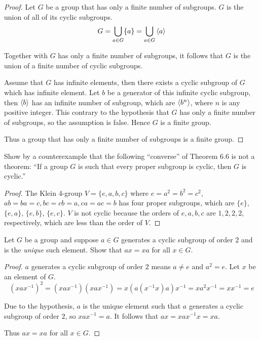 \begin{proof}
    Let $G$ be a group that has only a finite number of subgroups. $G$ is the union of all of its cyclic subgroups.
    \[
        G = \bigcup_{a\in G} \{ a \} = \bigcup_{a\in G}\left\langle{a}\right\rangle
    \]

    Together with $G$ has only a finite number of subgroups, it follows that $G$ is the union of a finite number of cyclic subgroups.

    Assume that $G$ has infinite elements, then there exists a cyclic subgroup of $G$ which has infinite element. Let $b$ be a generator of this infinite cyclic subgroup, then $\left\langle{b}\right\rangle$ has an infinite number of subgroup, which are $\left\langle{b^{n}}\right\rangle$, where $n$ is any positive integer. This contrary to the hypothesis that $G$ has only a finite number of subgroups, so the assumption is false. Hence $G$ is a finite group.

    Thus a group that has only a finite number of subgroups is a finite group.
\end{proof}

\begin{exercise}
    Show by a counterexample that the following ``converse'' of Theorem 6.6 is not a theorem: ``If a group $G$ is such that every proper subgroup is cyclic, then $G$ is cyclic.\@''
\end{exercise}

\begin{proof}
    The Klein 4-group $V = \{ e, a, b, c \}$ where $e = a^{2} = b^{2} = c^{2}$, $ab = ba = c, bc = cb = a, ca = ac = b$ has four proper subgroups, which are $\{ e \}$, $\{ e, a \}$, $\{ e, b \}$, $\{ e, c \}$. $V$ is not cyclic because the orders of $e, a, b, c$ are $1, 2, 2, 2$, respectively, which are less than the order of $V$.
\end{proof}

\begin{exercise}
    Let $G$ be a group and suppose $a\in G$ generates a cyclic subgroup of order $2$ and is the \textit{unique} such element. Show that $ax = xa$ for all $x\in G$.
\end{exercise}

\begin{proof}
    $a$ generates a cyclic subgroup of order $2$ means $a\ne e$ and $a^{2} = e$. Let $x$ be an element of $G$.
    \[
        {(xax^{-1})}^{2} = (xax^{-1})(xax^{-1}) = x(a(x^{-1}x)a)x^{-1} = xa^{2}x^{-1} = xx^{-1} = e
    \]

    Due to the hypothesis, $a$ is the unique element such that $a$ generates a cyclic subgroup of order $2$, so $xax^{-1} = a$. It follows that $ax = xax^{-1}x = xa$.

    Thus $ax = xa$ for all $x\in G$.
\end{proof}

